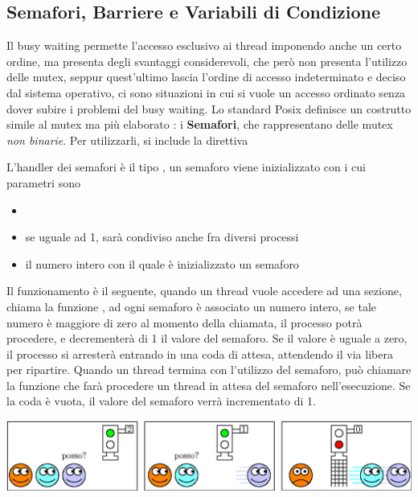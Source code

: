 \documentclass[10pt, letterpaper]{report}
\begin{document}
\subsection{Semafori, Barriere e Variabili di Condizione}
Il busy waiting permette l'accesso esclusivo ai thread imponendo anche un certo ordine, ma presenta 
degli svantaggi considerevoli, che però non presenta l'utilizzo delle mutex, seppur quest'ultimo 
lascia l'ordine di accesso indeterminato e deciso dal sistema operativo, ci sono situazioni in cui 
si vuole un accesso ordinato senza dover subire i problemi del busy waiting.\acc 
Lo standard Posix definisce un costrutto simile al mutex ma più elaborato : i \textbf{Semafori}, che rappresentano 
delle mutex \textit{non binarie}. Per utilizzarli, si include la direttiva\begin{quotation}
\end{quotation}
L'handler dei semafori è il tipo , un semaforo viene inizializzato con  i cui 
parametri sono\begin{itemize}
    \item {}
    \item {} se uguale ad 1, sarà condiviso anche fra diversi processi 
    \item {} il numero intero con il quale è inizializzato un semaforo
\end{itemize}
Il funzionamento è il seguente, quando un thread vuole accedere ad una sezione, chiama la funzione 
, ad ogni semaforo è associato un numero intero, se tale numero è maggiore 
di zero al momento della chiamata, il processo potrà procedere, e decrementerà di 1 il valore del semaforo. \acc 
Se il valore è uguale a zero, il processo si arresterà entrando in una 
coda di attesa, attendendo il via libera per ripartire.\acc 
Quando un thread termina con l'utilizzo del semaforo, può chiamare la funzione  che 
farà procedere un thread in attesa del semaforo nell'esecuzione. Se la coda è vuota, il valore del semaforo verrà incrementato 
di 1.\begin{center}
    \includegraphics[width=1\textwidth]{images/sem.eps}
\end{center}
\end{document}
